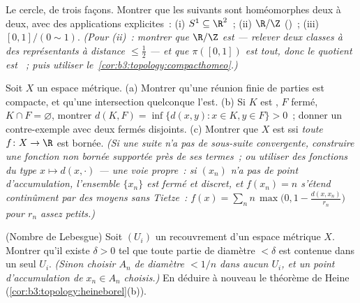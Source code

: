 \begin{exercise}[$\star\star$]\label{exo:b3:topology:5}
Le cercle, de trois façons. Montrer que les suivants sont
homéomorphes deux à deux, avec des applications explicites~:
(i) $S^1 \subseteq \R^2$~; (ii) $\R/\Z$ ()~;
(iii) $[0,1]/(0 \sim 1)$.
\emph{(Pour (ii)~: montrer que $\R/\Z$ est  --- relever
deux classes à des représentants à distance $\leq \frac12$ ---
et que $\pi([0,1])$ est tout, donc le quotient est ~;
puis utiliser le~\cref{cor:b3:topology:compacthomeo}.)}
\end{exercise}

\begin{exercise}[$\star\star$]\label{exo:b3:topology:6}
Soit $X$ un espace métrique.
(a) Montrer qu'une réunion finie de parties  est
compacte, et qu'une intersection quelconque l'est.
(b) Si $K$ est , $F$ fermé, $K \cap F = \varnothing$,
montrer $d(K, F) = \inf\{d(x,y) : x \in K, y \in F\} > 0$~;
donner un contre-exemple avec deux fermés disjoints.
(c) Montrer que $X$ est  ssi \emph{toute} $f
\colon X \to \R$  est bornée. \emph{(Si une suite n'a
pas de sous-suite convergente, construire une fonction 
non bornée supportée près de ses termes~; ou utiliser des
fonctions du type $x \mapsto d(x, \cdot)$ --- une voie
propre~: si $(x_n)$ n'a pas de point d'accumulation, l'ensemble
$\{x_n\}$ est fermé et discret, et $f(x_n) = n$ s'étend
continûment par des moyens sans Tietze~:
$f(x) = \sum_n n\,\max\bigl(0, 1 - \frac{d(x, x_n)}{r_n}\bigr)$
pour $r_n$ assez petits.)}
\end{exercise}

\begin{exercise}[$\star\star$]\label{exo:b3:topology:7}
(Nombre de Lebesgue) Soit $(U_i)$ un recouvrement  d'un
espace métrique  $X$. Montrer qu'il existe $\delta > 0$
tel que toute partie de diamètre $< \delta$ est contenue dans
un seul $U_i$.
\emph{(Sinon choisir $A_n$ de diamètre $< 1/n$ dans aucun
$U_i$, et un point d'accumulation de $x_n \in A_n$ choisis.)}
En déduire à nouveau le théorème de Heine
(\cref{cor:b3:topology:heineborel}(b)).
\end{exercise}

